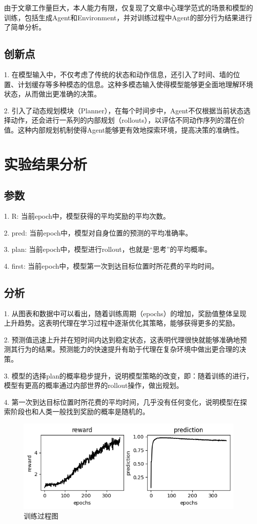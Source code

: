 \documentclass[UTF8,12pt]{article} %
\begin{document}
	由于文章工作量巨大，本人能力有限，仅复现了文章中心理学范式的场景和模型的训练，包括生成Agent和Environment，并对训练过程中Agent的部分行为结果进行了简单分析。

\subsection{创新点}
1. 在模型输入中，不仅考虑了传统的状态和动作信息，还引入了时间、墙的位置、计划缓存等多种模态的信息。这种多模态输入使得模型能够更全面地理解环境状态，从而做出更准确的决策。

2. 引入了动态规划模块（Planner），在每个时间步中，Agent不仅根据当前状态选择动作，还会进行一系列的内部规划（rollouts），以评估不同动作序列的潜在价值。这种内部规划机制使得Agent能够更有效地探索环境，提高决策的准确性。

\section{实验结果分析}
\subsection{参数}

1. R: 当前epoch中，模型获得的平均奖励的平均次数。

2. pred: 当前epoch中，模型对自身位置的预测的平均准确率。

3. plan: 当前epoch中，模型进行rollout，也就是“思考”的平均概率。

4. first: 当前epoch中，模型第一次到达目标位置时所花费的平均时间。

\subsection{分析}

1. 从图表和数据中可以看出，随着训练周期（epochs）的增加，奖励值整体呈现上升趋势。这表明代理在学习过程中逐渐优化其策略，能够获得更多的奖励。 

2. 预测值迅速上升并在短时间内达到稳定状态，这表明代理很快就能够准确地预测其行为的结果。预测能力的快速提升有助于代理在复杂环境中做出更合理的决策。

3. 模型的选择plan的概率稳步提升，说明模型策略的改变，即：随着训练的进行，模型有更高的概率通过内部世界的rollout操作，做出规划。

4. 第一次到达目标位置时所花费的平均时间，几乎没有任何变化，说明模型在探索阶段也和人类一般找到奖励的概率是随机的。


\begin{figure}[H]
	\center
	\includegraphics*[width=16cm]{figs/progress.png}
	\centering
	\caption{训练过程图}\label{fig:fig-progress}
\end{figure}
\end{document}
